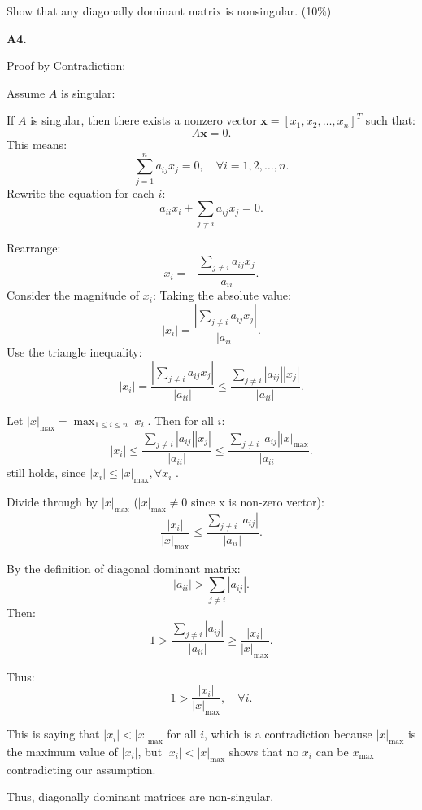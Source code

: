 \documentclass[12pt]{article}
\begin{document}
Show that any diagonally dominant matrix is nonsingular. \hfill (10\%)
\vspace{\baselineskip}

\textbf{A4.}

 Proof by Contradiction:
\vspace{\baselineskip}

    Assume \( A \) is singular:

    If \( A \) is singular, then there exists a nonzero vector \( \mathbf{x} = [x_1, x_2, \dots, x_n]^T \) such that:
    \[
    A \mathbf{x} = 0.
    \]
    This means:
    \[
    \sum_{j=1}^n a_{ij} x_j = 0, \quad \forall i = 1, 2, \dots, n.
    \]
    Rewrite the equation for each \( i \):
    \[
    a_{ii} x_i + \sum_{j \neq i} a_{ij} x_j = 0.
    \]
    
    Rearrange:
    \[
    x_i = -\frac{\sum_{j \neq i} a_{ij} x_j}{a_{ii}}.
    \]
    Consider the magnitude of \( x_i \):
    Taking the absolute value:
    \[
    |x_i| = \frac{\left| \sum_{j \neq i} a_{ij} x_j \right|}{|a_{ii}|}.
    \]
    Use the triangle inequality:
   \[
     |x_i| = \frac{\left| \sum_{j \neq i} a_{ij} x_j \right|}{|a_{ii}|} \leq \frac{\sum_{j \neq i} |a_{ij}| |x_j|}{|a_{ii}|}.
   \]
   
    Let \( |x|_{\max} = \max_{1 \leq i \leq n} |x_i| \). Then for all \( i \):
   \[
   |x_i| \leq \frac{\sum_{j \neq i} |a_{ij}| |x_j|}{|a_{ii}|} \leq \frac{\sum_{j \neq i} |a_{ij}| |x|_{\max}}{|a_{ii}|}.
   \]
    still holds, since \( |x_i| \leq |x|_{\max}, \forall x_i\) .
    
    Divide through by \( |x|_{\max} \) (\( |x|_{\max} \neq 0 \) since x is 
   non-zero vector):
   \[
   \frac{|x_i|}{|x|_{\max}} \leq \frac{\sum_{j \neq i} |a_{ij}|}{|a_{ii}|}.
   \]
   
   By the definition of diagonal dominant matrix:
   \[
   |a_{ii}| > \sum_{j \neq i} |a_{ij}| .
   \]
   Then:
   \[
   1 > \frac{\sum_{j \neq i} |a_{ij}|}{|a_{ii}|} \ge \frac{|x_i|}{|x|_{\max}}.
   \]

   Thus:
   \[
   1> \frac{|x_i|}{|x|_{\max}} , \quad \forall i.
   \]
  
This is saying that \( |x_i| < |x|_{\max} \) for all $i$, which is a contradiction because \( |x|_{\max} \) is the maximum value of \( |x_i| \), but \( |x_i| < |x|_{\max} \) shows that no $x_i$ can be $x_{\max}$ contradicting our assumption. 
\vspace{\baselineskip}

Thus, diagonally dominant matrices are non-singular.
\end{document}
